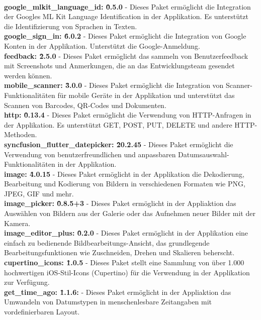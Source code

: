 \\
\textbf{google\_mlkit\_language\_id: \^0.5.0}\cite{package_google_mlkit_language_id} - Dieses Paket ermöglicht die Integration der Googles ML Kit Language Identification in der Applikation. Es unterstützt die Identifizierung von Sprachen in Texten.
\\
\textbf{google\_sign\_in: \^6.0.2}\cite{package_google_sign_in} - Dieses Paket ermöglicht die Integration von Google Konten in der Applikation. Unterstützt die Google-Anmeldung.
\\
\textbf{feedback: \^2.5.0}\cite{package_feedback} - Dieses Paket ermöglicht das sammeln von Benutzerfeedback mit Screenshots und Anmerkungen, die an das Entwicklungsteam gesendet werden können.
\\
\textbf{mobile\_scanner: \^3.0.0}\cite{package_mobile_scanner} - Dieses Paket ermöglicht die Integration von Scanner-Funktionalitäten für mobile Geräte in der Applikation und unterstützt das Scannen von Barcodes, QR-Codes und Dokumenten.
\\
\textbf{http: \^0.13.4}\cite{package_http} - Dieses Paket ermöglicht die Verwendung von HTTP-Anfragen in der Applikation. Es unterstützt GET, POST, PUT, DELETE und andere HTTP-Methoden.
\\
\textbf{syncfusion\_flutter\_datepicker: \^20.2.45}\cite{package_syncfusion_flutter_datepicker} - Dieses Paket ermöglicht die Verwendung von benutzerfreundlichen und anpassbaren Datumsauswahl-Funktionalitäten in der Applikation.
\\
\textbf{image: \^4.0.15}\cite{package_image} - Dieses Paket ermöglicht in der Applikation die Dekodierung, Bearbeitung und Kodierung von Bildern in verschiedenen Formaten wie PNG, JPEG, GIF und mehr.
\\
\textbf{image\_picker: \^0.8.5+3}\cite{package_image_picker} - Dieses Paket ermöglicht in der Appliaktion das Auswählen von Bildern aus der Galerie oder das Aufnehmen neuer Bilder mit der Kamera.
\\
\textbf{image\_editor\_plus: \^0.2.0}\cite{package_image_editor_plus} - Dieses Paket ermöglicht in der Applikation eine einfach zu bedienende Bildbearbeitungs-Ansicht, das grundlegende Bearbeitungsfunktionen wie Zuschneiden, Drehen und Skalieren beherscht.
\\
\textbf{cupertino\_icons: \^1.0.5}\cite{package_cupertino_icons} - Dieses Paket stellt eine Sammlung von über 1.000 hochwertigen iOS-Stil-Icons (Cupertino) für die Verwendung in der Applikation zur Verfügung.
\\
\textbf{get\_time\_ago: \^1.1.6:}\cite{package_get_time_ago} - Dieses Paket ermöglicht in der Appliaktion das Umwandeln von Datumstypen in menschenlesbare Zeitangaben mit vordefinierbaren Layout.


